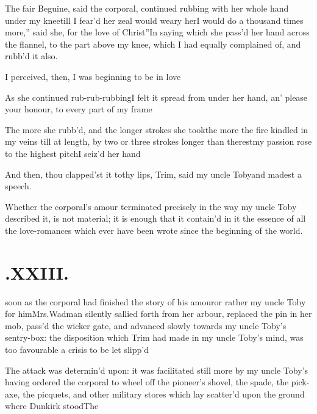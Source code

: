 \documentclass{article}
\begin{document}
The fair Beguine, said the corporal, continued rubbing with her whole
hand under my knee\tsk till I fear’d her zeal would weary
her\tsh \lqq I would do a\break
\lqq thousand times more,” said she, \lqq for\break
\lqq the love of Christ”\tsh In saying which\break
she pass’d her hand across the flannel, to\break
the part above my knee, which I had\break
equally complained of, and rubb’d it\break
also.


I perceived, then, I was beginning to be in
love\tsh

As she continued rub-rub-rubbing\tsk I felt it spread from
under her hand, an’ please your honour, to every part of my
frame\tsh

The more she rubb’d, and the longer strokes she
took\tsh the more the fire kindled in my veins \tsh till at length, by
two or three strokes longer than the\break rest\tsh my passion
rose to the highest pitch\tsh I seiz’d her
hand\tsh

\tsh And then, thou clapped’st it to\break thy lips,
Trim, said my uncle Toby\tsh\break and madest a
speech.

Whether the corporal’s amour terminated precisely in the
way my uncle Toby described it, is not material; it is
enough that it contain'd in it the essence of all the love-romances
which ever have been wrote since the beginning of the world.

\vfill{}\eject\null
\section{.\enspace XXIII.}

 soon as the corporal had finished\break
the story of his amour\tsh or rather my uncle Toby for
him\tsk Mrs.\break Wadman silently sallied forth from her
arbour, replaced the pin in her mob, pass’d the wicker gate,
and advanced slowly towards my uncle Toby’s
sentry-box: the disposition which Trim had made in my uncle
Toby’s mind, was too favourable a crisis to be let
slipp’d\tsh

\tsh The attack was determin’d upon: it was facilitated still more by my uncle
Toby’s having ordered the corporal to wheel off the pioneer’s shovel, the spade, the
pick-axe, the picquets, and other military stores which lay scatter’d upon the
ground where Dunkirk stood\tsk The 
\end{document}
